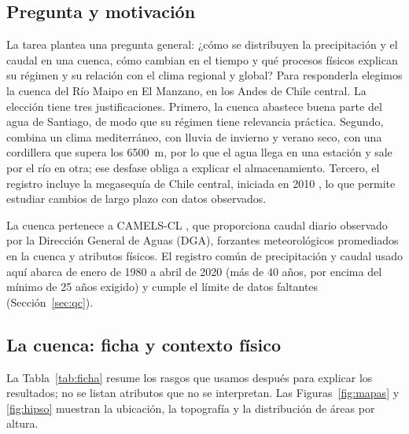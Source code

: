 \documentclass[11pt,a4paper]{article}
\begin{document}
\subsection{Pregunta y motivación}

La tarea plantea una pregunta general: ¿cómo se distribuyen la precipitación y el caudal en una cuenca, cómo cambian en el tiempo y qué procesos físicos explican su régimen y su relación con el clima regional y global? Para responderla elegimos la cuenca del Río Maipo en El Manzano, en los Andes de Chile central. La elección tiene tres justificaciones. Primero, la cuenca abastece buena parte del agua de Santiago, de modo que su régimen tiene relevancia práctica. Segundo, combina un clima mediterráneo, con lluvia de invierno y verano seco, con una cordillera que supera los 6500~m, por lo que el agua llega en una estación y sale por el río en otra; ese desfase obliga a explicar el almacenamiento. Tercero, el registro incluye la megasequía de Chile central, iniciada en 2010 \citep{Garreaud2017,Garreaud2020}, lo que permite estudiar cambios de largo plazo con datos observados.

La cuenca pertenece a CAMELS-CL \citep{AlvarezGarreton2018}, que proporciona caudal diario observado por la Dirección General de Aguas (DGA), forzantes meteorológicos promediados en la cuenca y atributos físicos. El registro común de precipitación y caudal usado aquí abarca de enero de 1980 a abril de 2020 (más de 40 años, por encima del mínimo de 25 años exigido) y cumple el límite de datos faltantes (Sección~\ref{sec:qc}).

\subsection{La cuenca: ficha y contexto físico}
\label{sec:ficha}

La Tabla~\ref{tab:ficha} resume los rasgos que usamos después para explicar los resultados; no se listan atributos que no se interpretan. Las Figuras~\ref{fig:mapas} y \ref{fig:hipso} muestran la ubicación, la topografía y la distribución de áreas por altura.
\end{document}
